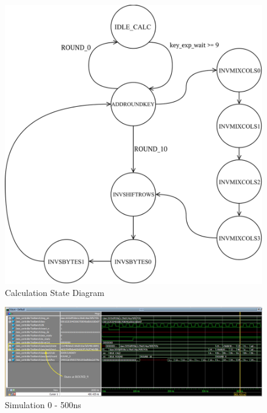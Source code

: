 \documentclass[journal, twocolumn, final,11pt,letterpaper]{IEEEtran}
\begin{document}
\begin{figure} [H]
	\centering
	\includegraphics[scale=.6]{Calc_State_Diagram.png}
	\caption{Calculation State Diagram\label{fig:calc-state}}
\end{figure}         





\begin{figure} [H]
	\centering
	\includegraphics[scale=.35]{simulate-0-500.png}
	\caption{Simulation 0 - 500ns\label{fig:0-500}}
\end{figure}          
\end{document}
